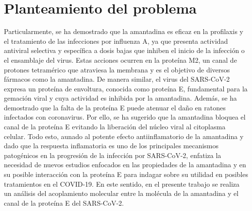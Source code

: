\documentclass[12 pt]{article}
\begin{document}
\section{Planteamiento del problema}
Particularmente, se ha demostrado que la amantadina es eficaz en la profilaxis y el tratamiento de las infecciones por influenza A, ya que presenta actividad antiviral selectiva y específica a dosis bajas que inhiben el inicio de la infección o el ensamblaje del virus\citep{hay1985molecular}. Estas acciones ocurren en la proteína M2, un canal de protones tetramérico que atraviesa la membrana y es el objetivo de diversos fármacos como la amantadina\citep{cady2010structure}. De manera similar, el virus del SARS-CoV-2 expresa un proteína de envoltura, conocida como proteína E, fundamental para la gemación viral y cuya actividad es inhibida por la amantadina\citep{torres2007conductance}. Además, se ha demostrado que la falta de la proteína E puede atenuar el daño en ratones infectados con coronavirus\citep{jimenez2014pdz}. Por ello, se ha sugerido que la amantadina bloquea el canal de la proteína E evitando la liberación del núcleo viral al citoplasma celular\citep{abreu2020amantadine}. Todo esto, aunado al potente efecto antiinflamatorio de la amantadina y dado que la respuesta inflamatoria es uno de los principales mecanismos patogénicos en la progresión de la infección por SARS-CoV-2\citep{jimenez2020anti}, enfatiza la necesidad de nuevos estudios enfocados en las propiedades de la amantadina y en su posible interacción con la proteína E para indagar sobre su utilidad en posibles tratamientos en el COVID-19. En este sentido, en el presente trabajo se realiza un análisis del acoplamiento molecular entre la molécula de la amantadina y el canal de la proteína E del SARS-CoV-2.\\\\
\end{document}
